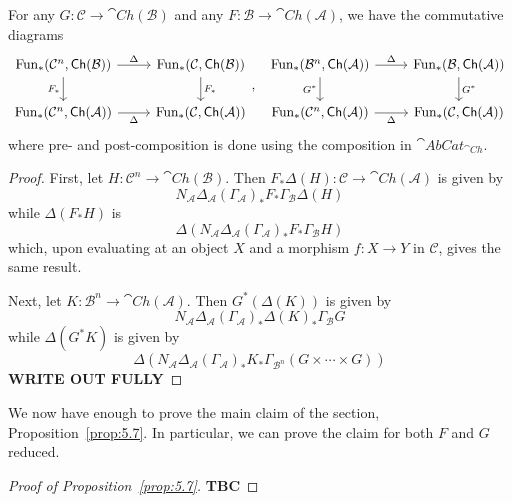 \begin{lem}[label=lem:B.8]
    For any $G:\mathcal{C}\to \cat{Ch}(\mathcal{B})$ and any $F:\mathcal{B}\to \cat{Ch}(\mathcal{A})$, we have the commutative diagrams
    \begin{equation*}
        \begin{tikzcd}
            {\text{Fun}_*(\mathcal{C}^n,\cat{Ch}(\mathcal{B}))} & {\text{Fun}_*(\mathcal{C},\cat{Ch}(\mathcal{B}))} \\
            {\text{Fun}_*(\mathcal{C}^n,\cat{Ch}(\mathcal{A}))} & {\text{Fun}_*(\mathcal{C},\cat{Ch}(\mathcal{A}))}
            \arrow["\Delta", from=1-1, to=1-2]
            \arrow["{F_*}"', from=1-1, to=2-1]
            \arrow["{F_*}", from=1-2, to=2-2]
            \arrow["\Delta"', from=2-1, to=2-2]
        \end{tikzcd},\;\;\begin{tikzcd}
            {\text{Fun}_*(\mathcal{B}^n,\cat{Ch}(\mathcal{A}))} & {\text{Fun}_*(\mathcal{B},\cat{Ch}(\mathcal{A}))} \\
            {\text{Fun}_*(\mathcal{C}^n,\cat{Ch}(\mathcal{A}))} & {\text{Fun}_*(\mathcal{C},\cat{Ch}(\mathcal{A}))}
            \arrow["\Delta", from=1-1, to=1-2]
            \arrow["{G^*}"', from=1-1, to=2-1]
            \arrow["{G^*}", from=1-2, to=2-2]
            \arrow["\Delta"', from=2-1, to=2-2]
        \end{tikzcd}
    \end{equation*}
    where pre- and post-composition is done using the composition in $\cat{AbCat}_{\cat{Ch}}$.
\end{lem}
\begin{proof}
    First, let $H:\mathcal{C}^n\to \cat{Ch}(\mathcal{B})$. Then $F_*\Delta(H):\mathcal{C}\to \cat{Ch}(\mathcal{A})$ is given by 
    \begin{equation*}
        N_\mathcal{A}\Delta_\mathcal{A}(\Gamma_\mathcal{A})_*F_*\Gamma_\mathcal{B}\Delta(H)
    \end{equation*}
    while $\Delta(F_*H)$ is 
    \begin{equation*}
        \Delta(N_\mathcal{A}\Delta_\mathcal{A}(\Gamma_\mathcal{A})_*F_*\Gamma_\mathcal{B}H)
    \end{equation*}
    which, upon evaluating at an object $X$ and a morphism $f:X\to Y$ in $\mathcal{C}$, gives the same result.

    \vspace{10pt}

    Next, let $K:\mathcal{B}^n\to \cat{Ch}(\mathcal{A})$. Then $G^*(\Delta(K))$ is given by 
    \begin{equation*}
        N_\mathcal{A}\Delta_\mathcal{A}(\Gamma_\mathcal{A})_*\Delta(K)_*\Gamma_\mathcal{B}G
    \end{equation*}
    while $\Delta(G^*K)$ is given by 
    \begin{equation*}
        \Delta(N_\mathcal{A}\Delta_\mathcal{A}(\Gamma_\mathcal{A})_*K_*\Gamma_{\mathcal{B}^n}(G\times \cdots \times G))
    \end{equation*}
    \textbf{WRITE OUT FULLY}
\end{proof}

We now have enough to prove the main claim of the section, Proposition~\ref{prop:5.7}. In particular, we can prove the claim for both $F$ and $G$ reduced.

\begin{proof}[Proof of Proposition~\ref{prop:5.7}]
    \textbf{TBC}
\end{proof}